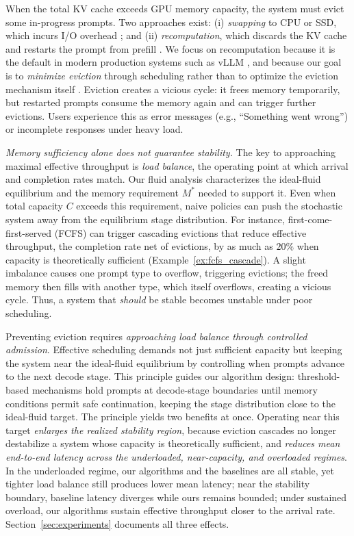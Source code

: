 When the total KV cache exceeds GPU memory capacity, the system must evict some in-progress prompts. Two approaches exist: (i) \emph{swapping} to CPU or SSD, which incurs I/O overhead \citep{sheng2023flexgen, aminabadi2022deepspeed}; and (ii) \emph{recomputation}, which discards the KV cache and restarts the prompt from prefill \citep{kwon2023efficient}. We focus on recomputation because it is the default in modern production systems such as vLLM \citep{vllm-v1-2025}, and because our goal is to \emph{minimize eviction} through scheduling rather than to optimize the eviction mechanism itself \citep{li2025mirage}. Eviction creates a vicious cycle: it frees memory temporarily, but restarted prompts consume the memory again and can trigger further evictions. Users experience this as error messages (e.g., ``Something went wrong'') or incomplete responses under heavy load.

\emph{Memory sufficiency alone does not guarantee stability.} The key to approaching maximal effective throughput is \emph{load balance}, the operating point at which arrival and completion rates match. Our fluid analysis characterizes the ideal-fluid equilibrium and the memory requirement \(M^*\) needed to support it. Even when total capacity \(C\) exceeds this requirement, naive policies can push the stochastic system away from the equilibrium stage distribution. For instance, first-come-first-served (FCFS) can trigger cascading evictions that reduce effective throughput, the completion rate net of evictions, by as much as \(20\%\) when capacity is theoretically sufficient (Example~\ref{ex:fcfs_cascade}). A slight imbalance causes one prompt type to overflow, triggering evictions; the freed memory then fills with another type, which itself overflows, creating a vicious cycle. Thus, a system that \emph{should} be stable becomes unstable under poor scheduling.

Preventing eviction requires \emph{approaching load balance through controlled admission}. Effective scheduling demands not just sufficient capacity but keeping the system near the ideal-fluid equilibrium by controlling when prompts advance to the next decode stage. This principle guides our algorithm design: threshold-based mechanisms hold prompts at decode-stage boundaries until memory conditions permit safe continuation, keeping the stage distribution close to the ideal-fluid target. The principle yields two benefits at once. Operating near this target \emph{enlarges the realized stability region}, because eviction cascades no longer destabilize a system whose capacity is theoretically sufficient, and \emph{reduces mean end-to-end latency across the underloaded, near-capacity, and overloaded regimes}. In the underloaded regime, our algorithms and the baselines are all stable, yet tighter load balance still produces lower mean latency; near the stability boundary, baseline latency diverges while ours remains bounded; under sustained overload, our algorithms sustain effective throughput closer to the arrival rate. Section~\ref{sec:experiments} documents all three effects.

